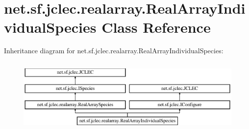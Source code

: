 \hypertarget{classnet_1_1sf_1_1jclec_1_1realarray_1_1_real_array_individual_species}{\section{net.\-sf.\-jclec.\-realarray.\-Real\-Array\-Individual\-Species Class Reference}
\label{classnet_1_1sf_1_1jclec_1_1realarray_1_1_real_array_individual_species}
}
Inheritance diagram for net.\-sf.\-jclec.\-realarray.\-Real\-Array\-Individual\-Species\-:\begin{figure}[H]
\begin{center}
\leavevmode
\includegraphics[height=3.733333cm]{classnet_1_1sf_1_1jclec_1_1realarray_1_1_real_array_individual_species}
\end{center}
\end{figure}
